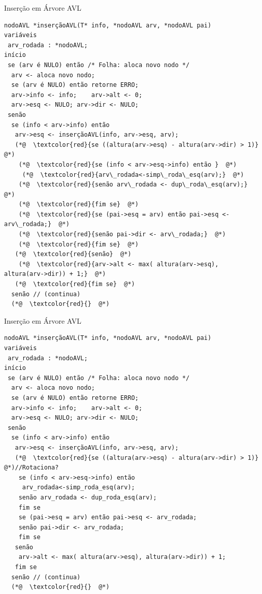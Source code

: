 \documentclass[12pt,table,xcolor={dvipsnames}]{beamer}
\begin{document}
\begin{frame}[fragile]{Inserção em Árvore AVL}
\begin{lstlisting}
nodoAVL *inserçãoAVL(T* info, *nodoAVL arv, *nodoAVL pai)
variáveis
 arv_rodada : *nodoAVL;
início
 se (arv é NULO) então /* Folha: aloca novo nodo */
  arv <- aloca novo nodo;
  se (arv é NULO) então retorne ERRO;
  arv->info <- info;	arv->alt <- 0;
  arv->esq <- NULO;	arv->dir <- NULO;
 senão
  se (info < arv->info) então
   arv->esq <- inserçãoAVL(info, arv->esq, arv);
   (*@  \textcolor{red}{se ((altura(arv->esq) - altura(arv->dir) > 1)}  @*)
    (*@  \textcolor{red}{se (info < arv->esq->info) então }  @*)
     (*@  \textcolor{red}{arv\_rodada<-simp\_roda\_esq(arv);}  @*)
    (*@  \textcolor{red}{senão arv\_rodada <- dup\_roda\_esq(arv);}  @*)
    (*@  \textcolor{red}{fim se}  @*)
    (*@  \textcolor{red}{se (pai->esq = arv) então pai->esq <- arv\_rodada;}  @*)
    (*@  \textcolor{red}{senão pai->dir <- arv\_rodada;}  @*)
    (*@  \textcolor{red}{fim se}  @*)
   (*@  \textcolor{red}{senão}  @*)
    (*@  \textcolor{red}{arv->alt <- max( altura(arv->esq), altura(arv->dir)) + 1;}  @*)
   (*@  \textcolor{red}{fim se}  @*)
  senão // (continua)
  (*@  \textcolor{red}{}  @*)
\end{lstlisting}
\end{frame}

\begin{frame}[fragile]{Inserção em Árvore AVL}
\begin{lstlisting}
nodoAVL *inserçãoAVL(T* info, *nodoAVL arv, *nodoAVL pai)
variáveis
 arv_rodada : *nodoAVL;
início
 se (arv é NULO) então /* Folha: aloca novo nodo */
  arv <- aloca novo nodo;
  se (arv é NULO) então retorne ERRO;
  arv->info <- info;	arv->alt <- 0;
  arv->esq <- NULO;	arv->dir <- NULO;
 senão
  se (info < arv->info) então
   arv->esq <- inserçãoAVL(info, arv->esq, arv);
   (*@  \textcolor{red}{se ((altura(arv->esq) - altura(arv->dir) > 1)}  @*)//Rotaciona?
    se (info < arv->esq->info) então 
     arv_rodada<-simp_roda_esq(arv);
    senão arv_rodada <- dup_roda_esq(arv);
    fim se
    se (pai->esq = arv) então pai->esq <- arv_rodada;
    senão pai->dir <- arv_rodada;
    fim se
   senão
    arv->alt <- max( altura(arv->esq), altura(arv->dir)) + 1;
   fim se
  senão // (continua)
  (*@  \textcolor{red}{}  @*)
\end{lstlisting}
\end{frame}
\end{document}
